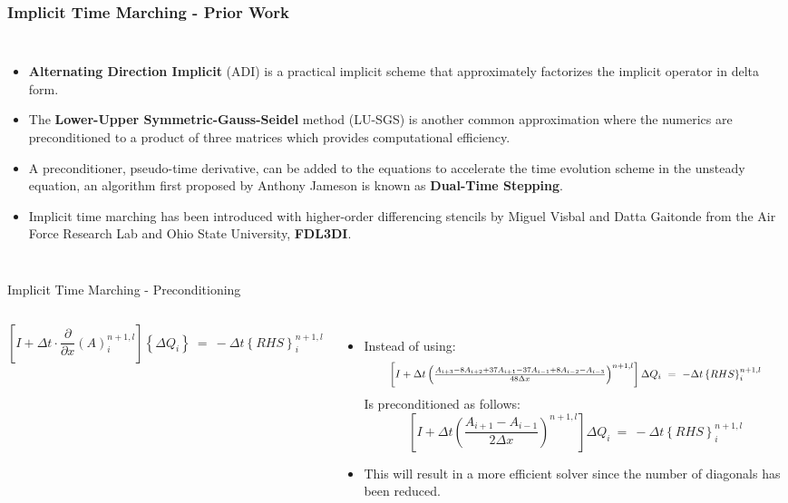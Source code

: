 \begin{frame}\frametitle{Implicit Time Marching - Prior Work}
  \begin{columns}
    \begin{itemize}
      \item \textbf{Alternating Direction Implicit} (ADI) is a practical implicit scheme that 
            approximately factorizes the implicit operator in delta form.
      \item The \textbf{Lower-Upper Symmetric-Gauss-Seidel} method (LU-SGS) is another common 
          approximation where the numerics are preconditioned to a product of three matrices which 
          provides computational efficiency.
      \item A preconditioner, pseudo-time derivative, can be added to the equations to accelerate
        the time evolution scheme in the unsteady equation, an algorithm first proposed by Anthony
        Jameson is known as \textbf{Dual-Time Stepping}.
      \item Implicit time marching has been introduced with higher-order differencing stencils
            by Miguel Visbal and Datta Gaitonde from the Air Force Research Lab and Ohio State 
            University, \textbf{FDL3DI}.
    \end{itemize}  
  \end{columns}
\end{frame}

\begin{frame}{Implicit Time Marching - Preconditioning}
  \begin{columns}
    \begin{equation*}
      \left[I+\Delta{t}\cdot\frac{\partial}{\partial{x}}
         \left(A\right)_{i}^{n+1,l}\right]\left\{\Delta{Q_{i}}\right\}~=~
      -\Delta{t}\left\{RHS\right\}_i^{n+1,l}            
    \end{equation*}
    \begin{itemize}
		  \item Instead of using:
      \begin{equation}
	      \label{eq:RDRP_NS}\resizebox{0.85\hsize}{!}{$%
  		  \left[I+\Delta{t}\left(\frac{A_{i+3}-8A_{i+2}+37A_{i+1}-37A_{i-1}+8A_{i-2}-A_{i-3}}
        {48\Delta{x}}\right)^{n+1,l}\right]\Delta{Q}_i~=~-\Delta{t}\left\{RHS\right\}_i^{n+1,l}$}
      \end{equation}
      Is preconditioned as follows:
      \begin{equation}
      	\label{eq:TriDi_NS}
        		\left[I+\Delta{t}\left(\frac{A_{i+1}-A_{i-1}}{2\Delta{x}}\right)^{n+1,l}\right]
            \Delta{Q}_i~=~-\Delta{t}\left\{RHS\right\}_i^{n+1, l}
      \end{equation}
		  \item This will result in a more efficient solver since the number of diagonals has been 
            reduced.
    \end{itemize}  
  \end{columns}
\end{frame}

